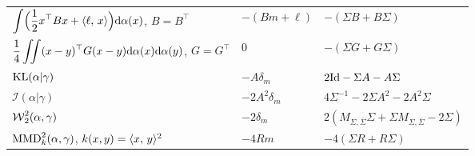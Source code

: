 \begin{prop}
\begin{center}
\begin{tabularx}{\linewidth}{>{\raggedright\arraybackslash}p{.42\linewidth}>{\centering\arraybackslash}p{.18\linewidth}>{\raggedright\arraybackslash}X}
			\(\displaystyle \int\Bigl(\frac12x^\top Bx+\langle \ell,\,x\rangle\Bigr)\mathrm{d}\alpha(x)\), \(B=B^\top\)
			&
			\(-(B m+\ell)\)
			&
			\(-(\Sigma B+B\Sigma)\)
			\\
			\(\displaystyle \frac14\iint (x-y)^\top G(x-y)\mathrm{d}\alpha(x)\mathrm{d}\alpha(y)\), \(G=G^\top\)
			&
			\(0\)
			&
			\(-(\Sigma G+G\Sigma)\)
			\\
			\(\operatorname{KL}(\alpha|\gamma)\)
			&
			\(-A\delta_m\)
			&
			\(2\mathrm{Id}-\Sigma A-A\Sigma\)
			\\
			\(\mathcal I(\alpha|\gamma)\)
			&
			\(-2A^2\delta_m\)
			&
			\(4\Sigma^{-1}-2\Sigma A^2-2A^2\Sigma\)
			\\
			\(\operatorname{\mathcal{W}}_2^2(\alpha,\gamma)\)
			&
			\(-2\delta_m\)
			&
			\(2(M_{\Sigma,\bar\Sigma}\Sigma+\Sigma M_{\Sigma,\bar\Sigma}-2\Sigma)\)
			\\
			\(\operatorname{MMD}_k^2(\alpha,\gamma)\), \(k(x,y)=\langle x,\,y\rangle^2\)
			&
			\(-4R m\)
			&
			\(-4(\Sigma R+R\Sigma)\)
			\\
			\hline
		\end{tabularx}
		\endgroup
		\end{center}
\end{prop}

